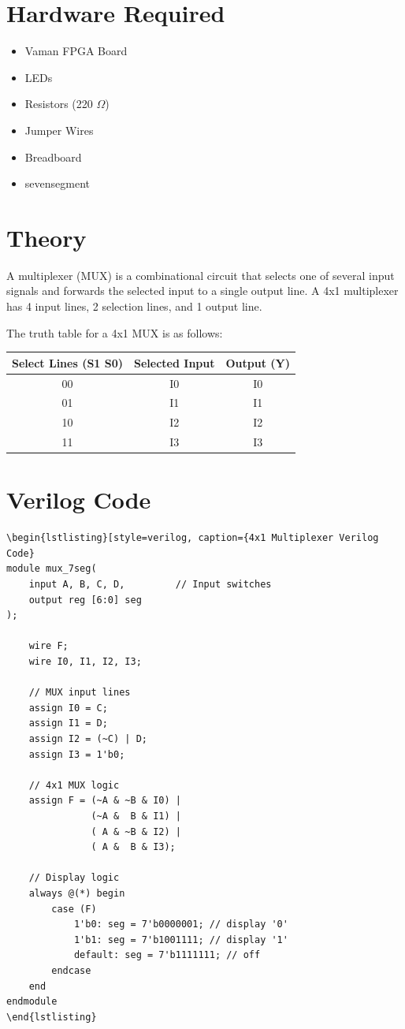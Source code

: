 \documentclass[a4paper,12pt]{article}
\begin{document}
\section*{Hardware Required}
\begin{itemize}
    \item Vaman FPGA Board
    \item LEDs
    \item Resistors (220 $\Omega$)
    \item Jumper Wires
    \item Breadboard
    \item sevensegment 
\end{itemize}

\section*{Theory}
A multiplexer (MUX) is a combinational circuit that selects one of several input signals and forwards the selected input to a single output line.  
A 4x1 multiplexer has 4 input lines, 2 selection lines, and 1 output line.

The truth table for a 4x1 MUX is as follows:

\begin{center}
\begin{tabular}{|c|c|c|}
\hline
Select Lines (S1 S0) & Selected Input & Output (Y) \\
\hline
00 & I0 & I0 \\
01 & I1 & I1 \\
10 & I2 & I2 \\
11 & I3 & I3 \\
\hline
\end{tabular}
\end{center}

\section*{Verilog Code}
\begin{verbatim}
\begin{lstlisting}[style=verilog, caption={4x1 Multiplexer Verilog Code}
module mux_7seg(
    input A, B, C, D,         // Input switches
    output reg [6:0] seg      
);

    wire F;
    wire I0, I1, I2, I3;

    // MUX input lines
    assign I0 = C;
    assign I1 = D;
    assign I2 = (~C) | D;
    assign I3 = 1'b0;

    // 4x1 MUX logic
    assign F = (~A & ~B & I0) |
               (~A &  B & I1) |
               ( A & ~B & I2) |
               ( A &  B & I3);

    // Display logic
    always @(*) begin
        case (F)
            1'b0: seg = 7'b0000001; // display '0'
            1'b1: seg = 7'b1001111; // display '1'
            default: seg = 7'b1111111; // off
        endcase
    end
endmodule
\end{lstlisting}
\end{verbatim}
\end{document}
